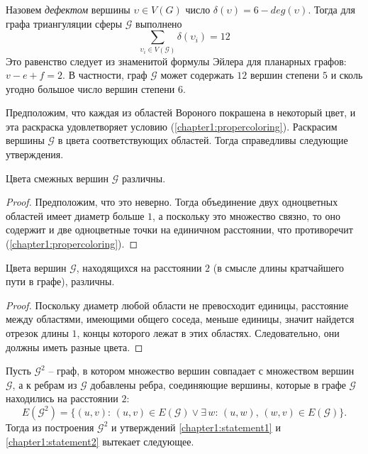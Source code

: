 Назовем \textit{дефектом} вершины $\upsilon \in V(G)$ 
число $\delta(\upsilon) = 6 - deg(\upsilon)$. 
Тогда для графа триангуляции сферы $\mathcal{G}$ выполнено 
\begin{equation}\label{chapter1:eq:defect}
\sum\limits_{\upsilon_i \in V(\mathcal{G})} \delta(\upsilon_i) = 12
\end{equation}
Это равенство следует из знаменитой формулы Эйлера для планарных графов: 
$v - e + f = 2$.
В частности, граф $\mathcal{G}$ может содержать $12$ вершин степени $5$ и сколь угодно большое число вершин степени $6$. 

Предположим, что каждая из областей Вороного покрашена в некоторый цвет, и эта раскраска удовлетворяет условию 
(\ref{chapter1:propercoloring}). Раскрасим вершины $\mathcal{G}$ в цвета соответствующих областей. Тогда справедливы следующие утверждения.

\begin{statement}\label{chapter1:statement1}
Цвета смежных вершин $\mathcal{G}$ различны. 
\end{statement}

\begin{proof}
Предположим, что это неверно. Тогда объединение двух одноцветных областей имеет диаметр больше $1$, а поскольку это множество связно, то оно содержит и две одноцветные точки на единичном расстоянии, что противоречит (\ref{chapter1:propercoloring}).
\end{proof}
 
\begin{statement}\label{chapter1:statement2}
Цвета вершин $\mathcal{G}$, находящихся на расстоянии $2$ (в смысле длины кратчайшего пути в графе), различны. 
\end{statement}

\begin{proof}
Поскольку диаметр любой области не превосходит единицы, расстояние между областями, имеющими общего соседа, меньше единицы,
значит найдется отрезок длины $1$, концы которого лежат в этих областях. Следовательно, они должны иметь разные цвета.
\end{proof}

Пусть $\mathcal{G}^2$ -- граф, в котором множество вершин совпадает с множеством вершин $\mathcal{G}$, 
а к ребрам из $\mathcal{G}$  добавлены ребра, соединяющие вершины, 
которые в графе $\mathcal{G}$ находились на расстоянии $2$:
$$E(\mathcal{G}^2) = \{ (u,v): \, (u,v) \in E(\mathcal{G}) \lor \exists \, w: \, (u,w),\,(w,v) \in E(\mathcal{G}) \}.$$
Тогда из построения $\mathcal{G}^2$ и утверждений 
\ref{chapter1:statement1} и \ref{chapter1:statement2} вытекает следующее.

